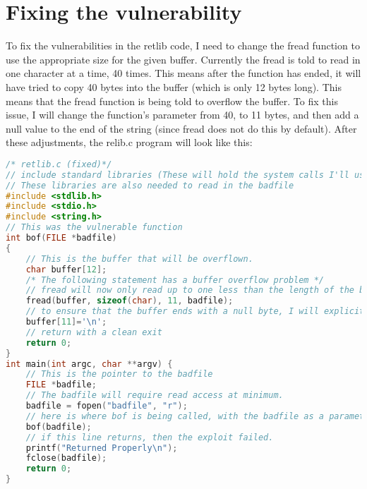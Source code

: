 \documentclass[14pt]{extarticle}
\begin{document}
\section{Fixing the vulnerability}
To fix the vulnerabilities in the retlib code, I need to change the fread function to use the appropriate size for the given buffer. Currently the fread is told to read in one character at a time, 40 times. This means after the function has ended, it will have tried to copy 40 bytes into the buffer (which is only 12 bytes long). This means that the fread function is being told to overflow the buffer. To fix this issue, I will change the function's parameter from 40, to 11 bytes, and then add a null value to the end of the string (since fread does not do this by default). After these adjustments, the relib.c program will look like this:
\begin{lstlisting}[language=c]
/* retlib.c (fixed)*/
// include standard libraries (These will hold the system calls I'll use in the exploit)
// These libraries are also needed to read in the badfile
#include <stdlib.h>
#include <stdio.h>
#include <string.h>
// This was the vulnerable function
int bof(FILE *badfile)
{
	// This is the buffer that will be overflown.
	char buffer[12];
	/* The following statement has a buffer overflow problem */
	// fread will now only read up to one less than the length of the buffer
	fread(buffer, sizeof(char), 11, badfile);
	// to ensure that the buffer ends with a null byte, I will explicitly add one as the last character
	buffer[11]='\n';
	// return with a clean exit
	return 0;
}
int main(int argc, char **argv) {
	// This is the pointer to the badfile
	FILE *badfile;
	// The badfile will require read access at minimum.
	badfile = fopen("badfile", "r");
	// here is where bof is being called, with the badfile as a parameter
	bof(badfile);
	// if this line returns, then the exploit failed.
	printf("Returned Properly\n");
	fclose(badfile);
	return 0;
}
\end{lstlisting}

\newpage


\end{document}
